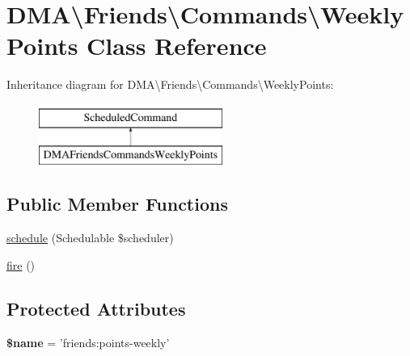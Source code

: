 \hypertarget{classDMA_1_1Friends_1_1Commands_1_1WeeklyPoints}{\section{D\-M\-A\textbackslash{}Friends\textbackslash{}Commands\textbackslash{}Weekly\-Points Class Reference}
\label{classDMA_1_1Friends_1_1Commands_1_1WeeklyPoints}
}
Inheritance diagram for D\-M\-A\textbackslash{}Friends\textbackslash{}Commands\textbackslash{}Weekly\-Points\-:\begin{figure}[H]
\begin{center}
\leavevmode
\includegraphics[height=2.000000cm]{d5/d03/classDMA_1_1Friends_1_1Commands_1_1WeeklyPoints}
\end{center}
\end{figure}
\subsection*{Public Member Functions}
\begin{DoxyCompactItemize}
\item 
\hyperlink{classDMA_1_1Friends_1_1Commands_1_1WeeklyPoints_a3610e0fd1a7e2e91dd70a05bfb7f94e8}{schedule} (Schedulable \$scheduler)
\item 
\hyperlink{classDMA_1_1Friends_1_1Commands_1_1WeeklyPoints_a3fb80cfeb37ba525e9b24e7362e35daf}{fire} ()
\end{DoxyCompactItemize}
\subsection*{Protected Attributes}
\begin{DoxyCompactItemize}
\item 
\hypertarget{classDMA_1_1Friends_1_1Commands_1_1WeeklyPoints_a246f543fbe9edae766eb00112beacf2c}{{\bfseries \$name} = 'friends\-:points-\/weekly'}\label{classDMA_1_1Friends_1_1Commands_1_1WeeklyPoints_a246f543fbe9edae766eb00112beacf2c}

\end{DoxyCompactItemize}


